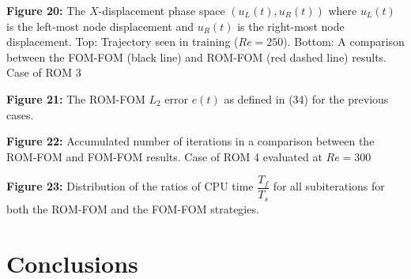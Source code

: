\documentclass[11pt]{article}
\begin{document}
\begin{center}
\textbf{Figure 20:} The $X$-displacement phase space $(u_L(t), u_R(t))$ where $u_L(t)$ is the left-most node displacement and $u_R(t)$ is the right-most node displacement. Top: Trajectory seen in training ($Re = 250$). Bottom: A comparison between the FOM-FOM (black line) and ROM-FOM (red dashed line) results. Case of ROM 3
\end{center}

\begin{center}
\textbf{Figure 21:} The ROM-FOM $L_2$ error $e(t)$ as defined in (34) for the previous cases.
\end{center}

\begin{center}
\textbf{Figure 22:} Accumulated number of iterations in a comparison between the ROM-FOM and FOM-FOM results. Case of ROM 4 evaluated at $Re = 300$
\end{center}

\begin{center}
\textbf{Figure 23:} Distribution of the ratios of CPU time $\dfrac{T_f}{T_s}$ for all subiterations for both the ROM-FOM and the FOM-FOM strategies.
\end{center}

\section{Conclusions}
\end{document}
